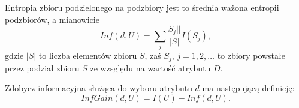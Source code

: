 Entropia zbioru podzielonego na podzbiory jest to średnia ważona entropii podzbiorów, a mianowicie
$$ Inf(d,U) = \sum_j \frac{S_j||}{|S|}I(S_j),$$
gdzie $|S|$ to liczba elementów  zbioru $S$, zaś $S_j$, $j=1,2,\dots$ to zbiory
powstałe przez podział zbioru $S$ ze wzsględu na wartość atrybutu $D$.

Zdobycz informacyjna służąca do wyboru atrybutu $d$ ma następującą definicję:
$$ InfGain(d,U) = I(U) - Inf(d,U).$$
